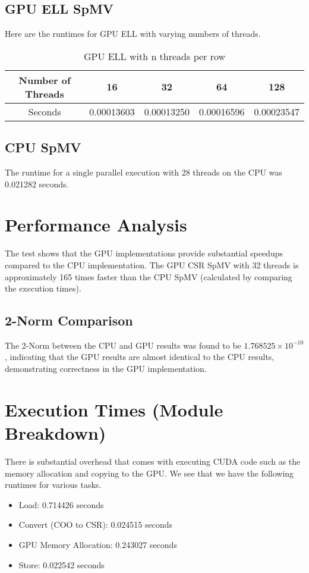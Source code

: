 \documentclass{article}
\begin{document}
\subsection*{GPU ELL SpMV}
Here are the runtimes for GPU ELL with varying numbers of threads.
\begin{table}[h!]
\centering
\begin{tabular}{|c|c|c|c|c|}
\hline
Number of Threads & 16 & 32 & 64 & 128 \\ \hline
Seconds & 0.00013603 & 0.00013250 & 0.00016596 & 0.00023547 \\ \hline
\end{tabular}
\caption{GPU ELL with n threads per row}
\label{tab:example}
\end{table}

\subsection*{CPU SpMV}
The runtime for a single parallel execution with 28 threads on the CPU was 0.021282 seconds.

\section*{Performance Analysis}

The test shows that the GPU implementations provide substantial speedups compared to the CPU implementation. The GPU CSR SpMV with 32 threads is approximately 165 times faster than the CPU SpMV (calculated by comparing the execution times).

\subsection*{2-Norm Comparison}
The 2-Norm between the CPU and GPU results was found to be $1.768525 \times 10^{-10}$, indicating that the GPU results are almost identical to the CPU results, demonstrating correctness in the GPU implementation.

\section*{Execution Times (Module Breakdown)}

There is substantial overhead that comes with executing CUDA code such as the memory allocation and copying to the GPU. We see that we have the following runtimes for various tasks.
\begin{itemize}
    \item Load: 0.714426 seconds
    \item Convert (COO to CSR): 0.024515 seconds
    \item GPU Memory Allocation: 0.243027 seconds
    \item Store: 0.022542 seconds
\end{itemize}
\end{document}
